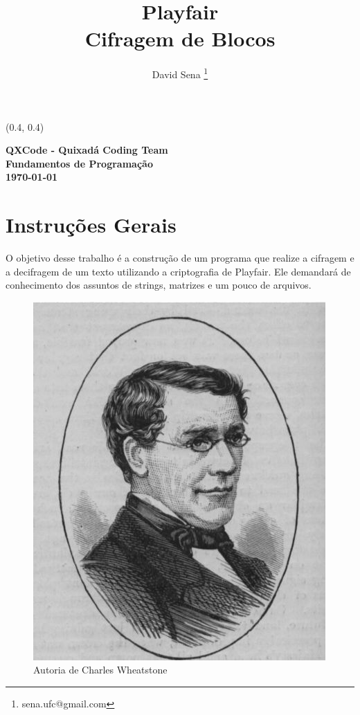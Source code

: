 \documentclass[12pt]{article}
\renewcommand{\bf}[1]{\textbf{#1}}
\begin{document}

\begin{textblock}{15}(0.4, 0.4)
\noindent
\begin{center}
\LARGE{\bf{QXCode - Quixadá Coding Team}}\\
\large{\bf{Fundamentos de Programação}} \\
\large{\bf{\today}}
\end{center}
\end{textblock}

\title{\bf{Playfair \\ Cifragem de Blocos}}

\author{
David Sena \thanks{sena.ufc@gmail.com}
}

\date{}

\maketitle
\thispagestyle{empty}



\section{Instruções Gerais}
O objetivo desse trabalho é a construção de um programa que realize a cifragem e a decifragem de um texto utilizando a criptografia de Playfair. Ele demandará de conhecimento dos assuntos de strings, matrizes e um pouco de arquivos. 

\begin{figure}[hf]
\centering
\includegraphics[width=0.3\linewidth]{./imagens/author}
\caption*{Autoria de Charles Wheatstone}
\end{figure}
\end{document}
